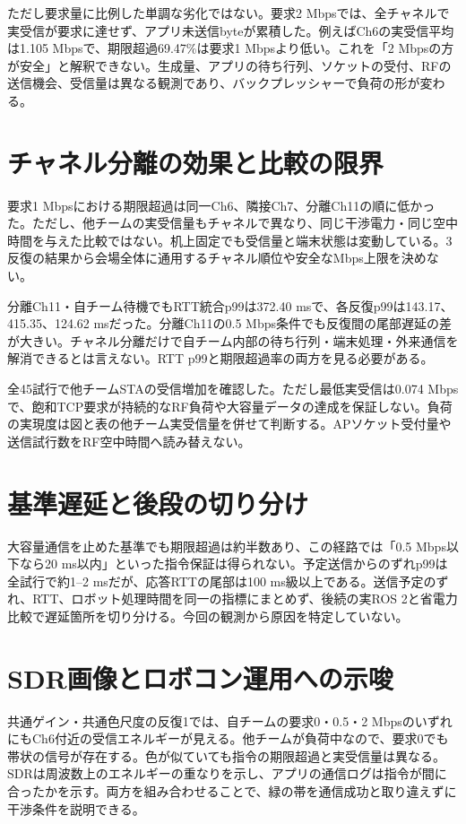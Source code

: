 \documentclass[a4paper,10pt]{ltjsarticle}
\begin{document}
ただし要求量に比例した単調な劣化ではない。要求2 Mbpsでは、全チャネルで実受信が要求に達せず、アプリ未送信byteが累積した。例えばCh6の実受信平均は1.105 Mbpsで、期限超過69.47\%は要求1 Mbpsより低い。これを「2 Mbpsの方が安全」と解釈できない。生成量、アプリの待ち行列、ソケットの受付、RFの送信機会、受信量は異なる観測であり、バックプレッシャーで負荷の形が変わる。

\section{チャネル分離の効果と比較の限界}

要求1 Mbpsにおける期限超過は同一Ch6、隣接Ch7、分離Ch11の順に低かった。ただし、他チームの実受信量もチャネルで異なり、同じ干渉電力・同じ空中時間を与えた比較ではない。机上固定でも受信量と端末状態は変動している。3反復の結果から会場全体に通用するチャネル順位や安全なMbps上限を決めない。

分離Ch11・自チーム待機でもRTT統合p99は372.40 msで、各反復p99は143.17、415.35、124.62 msだった。分離Ch11の0.5 Mbps条件でも反復間の尾部遅延の差が大きい。チャネル分離だけで自チーム内部の待ち行列・端末処理・外来通信を解消できるとは言えない。RTT p99と期限超過率の両方を見る必要がある。

全45試行で他チームSTAの受信増加を確認した。ただし最低実受信は0.074 Mbpsで、飽和TCP要求が持続的なRF負荷や大容量データの達成を保証しない。負荷の実現度は図と表の他チーム実受信量を併せて判断する。APソケット受付量や送信試行数をRF空中時間へ読み替えない。

\section{基準遅延と後段の切り分け}

大容量通信を止めた基準でも期限超過は約半数あり、この経路では「0.5 Mbps以下なら20 ms以内」といった指令保証は得られない。予定送信からのずれp99は全試行で約1–2 msだが、応答RTTの尾部は100 ms級以上である。送信予定のずれ、RTT、ロボット処理時間を同一の指標にまとめず、後続の実ROS 2と省電力比較で遅延箇所を切り分ける。今回の観測から原因を特定していない。

\section{SDR画像とロボコン運用への示唆}

共通ゲイン・共通色尺度の反復1では、自チームの要求0・0.5・2 MbpsのいずれにもCh6付近の受信エネルギーが見える。他チームが負荷中なので、要求0でも帯状の信号が存在する。色が似ていても指令の期限超過と実受信量は異なる。SDRは周波数上のエネルギーの重なりを示し、アプリの通信ログは指令が間に合ったかを示す。両方を組み合わせることで、緑の帯を通信成功と取り違えずに干渉条件を説明できる。
\end{document}
